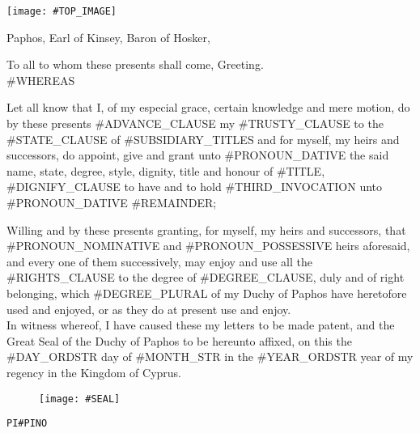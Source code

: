 \documentclass[varwidth=true,border=50pt]{standalone}
\begin{document}
\thispagestyle{fancy}

\noindent \texttt{[image: \#TOP\_IMAGE]}

{\LARGE
    Paphos, Earl of Kinsey, Baron of Hosker,

    \hspace{20pt} To all to whom these presents shall come, Greeting.\\

    #WHEREAS

    \hspace{20pt} Let all know that I, of my especial grace, certain knowledge and mere motion, do by these presents #ADVANCE_CLAUSE my #TRUSTY_CLAUSE \hspace{7pt}{\hoskeroe #GRANTEE}\hspace{7pt} to the #STATE_CLAUSE of \hspace{7pt}{\hoskeroe #TITLE}\hspace{7pt} #SUBSIDIARY_TITLES and for myself, my heirs and successors, do appoint, give and grant unto #PRONOUN_DATIVE the said name, state, degree, style, dignity, title and honour of #TITLE, #DIGNIFY_CLAUSE to have and to hold #THIRD_INVOCATION unto #PRONOUN_DATIVE #REMAINDER;

    \hspace{20pt} Willing and by these presents granting, for myself, my heirs and successors, that #PRONOUN_NOMINATIVE and #PRONOUN_POSSESSIVE heirs aforesaid, and every one of them successively, may enjoy and use all the #RIGHTS_CLAUSE to the degree of #DEGREE_CLAUSE, duly and of right belonging, which #DEGREE_PLURAL of my Duchy of Paphos have heretofore used and enjoyed, or as they do at present use and enjoy.\\

    \hspace{20pt} In witness whereof, I have caused these my letters to be made patent, and the Great Seal of the Duchy of Paphos to be hereunto affixed, on this the #DAY_ORDSTR day of #MONTH_STR in the #YEAR_ORDSTR year of my regency in the Kingdom of Cyprus.
}

\begin{figure}[h]
    \centering
    \texttt{[image: \#SEAL]}
\end{figure}

\hfill {\footnotesize \texttt{PI{#PINO}}}
\end{document}
